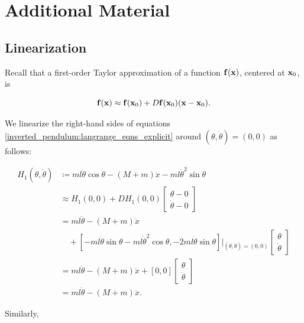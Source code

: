 \newpage

\section*{Additional Material} %

\subsection*{Linearization} %

Recall that a first-order Taylor approximation of a function $\mathbf{f}(\mathbf{x})$, centered at $\mathbf{x}_0$, is

\begin{equation*}
\mathbf{f}(\mathbf{x}) \approx \mathbf{f}(\mathbf{x}_0) + D\mathbf{f}(\mathbf{x}_0) (\mathbf{x} - \mathbf{x}_0).
\end{equation*}

\noindent We linearize the right-hand sides of equations \eqref{inverted_pendulum:langrange_eqns_explicit} around $(\theta, \dot \theta) = (0, 0)$ as follows:

\begin{align*}
H_1(\theta, \dot \theta) &\coloneq ml\ddot{\theta} \cos \theta - (M + m)\ddot{x} - ml \dot{\theta}^2 \sin \theta\\
&\approx H_1(0, 0) + DH_1(0, 0)
    \begin{bmatrix}
        \theta - 0\\
        \dot \theta - 0
    \end{bmatrix}\\
&= m l \ddot \theta - (M + m) \ddot x\\
& \quad + \left[- m l \ddot \theta \sin \theta - m l \dot \theta^2 \cos \theta,
- 2 m l \dot \theta \sin \theta \right]
\bigg|_{(\theta, \dot \theta) = (0, 0)}
    \begin{bmatrix}
        \theta\\
        \dot \theta
    \end{bmatrix}\\
&= m l \ddot \theta - (M + m) \ddot x + \left[0, 0 \right]
    \begin{bmatrix}
        \theta\\
        \dot \theta
    \end{bmatrix}\\
&= m l \ddot \theta - (M + m) \ddot x.
\end{align*}

\noindent Similarly,

